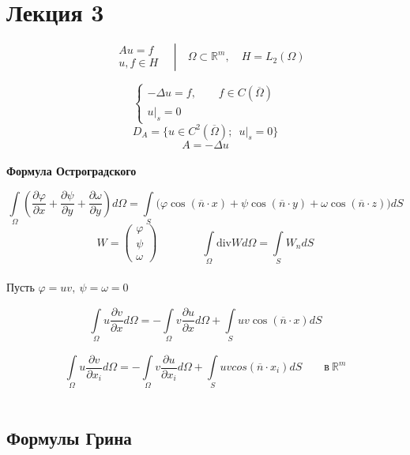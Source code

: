 \section{Лекция 3}

\begin{equation*}
	\left.\begin{aligned}
		&Au=f \\
		&u, f \in H
	\end{aligned}\quad \right | \quad \Omega \subset \mathbb{R}^m, \quad H = L_2(\Omega)
\end{equation*}

\[
\begin{cases}
	-\Delta u = f, \qquad f \in C(\overline{\Omega}) \\
	u |_{s} = 0
\end{cases}
\]
\[ D_A = \{u \in C^2 (\overline{\Omega}); \enspace u|_s = 0\} \]
\[ A = -\Delta u \] \\

\textbf{Формула Остроградского}

\[ \int\limits_{\Omega}\left(\frac{\partial \varphi}{\partial x } + \frac{\partial \psi }{\partial y} + \frac{\partial \omega}{\partial y}\right) d\Omega = \int\limits_{S } \biggl( \varphi \cos(\overline{n} \cdot x) + \psi \cos(\overline{n}\cdot y) + \omega \cos (\overline{n} \cdot z) \biggr) dS\]
\[ W =
\begin{pmatrix}
	\varphi \\
	\psi \\
	\omega
\end{pmatrix}
\qquad \qquad \int\limits_{\Omega}^{} \text{div} W d\Omega = \int\limits_{S}^{} W_n dS
\] \\


Пусть $ \varphi = uv, \ \psi = \omega = 0 $

\[ \int\limits_{\Omega} u \frac{\partial v }{\partial x } d \Omega = - \int\limits_{\Omega}^{} v \frac{\partial u }{\partial x } d \Omega + \int\limits_{S}^{} uv \cos(\overline{n} \cdot x) dS \]

\begin{equation}
	\label{3.0}
	\tag{3.0}
	\int\limits_{\Omega } u \frac{\partial v }{\partial x_i} d \Omega = - \int\limits_{\Omega }^{} v \frac{\partial u}{\partial x_i} d \Omega + \int\limits_{S }^{} uv cos(\overline{n} \cdot x_i ) dS \qquad \text{в} \ \mathbb{R}^m
\end{equation} \\

\subsection{Формулы Грина}

